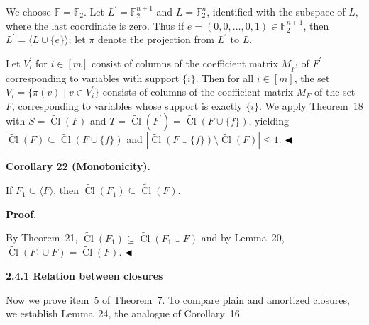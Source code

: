 We choose $\mathbb{F}=\mathbb{F}_{2}$. Let $L^{\prime}=\mathbb{F}_{2}^{n+1}$ and $L=\mathbb{F}_{2}^{n}$, identified with the subspace of
$L$, where the last coordinate is zero. Thus if $e=(0,0,\dots,0,1)\in\mathbb{F}_{2}^{n+1}$, then $L^{\prime}=\langle L\cup\{e\}\rangle$; let $\pi$ denote the projection from $L^{\prime}$ to $L$.\par



Let $V^{\prime}_{i}$ for $i\in[m]$ consist of columns of the coefficient matrix $M_{F^{\prime}}$ of $F^{\prime}$ corresponding to variables with support $\{i\}$. Then for all $i\in[m]$, the set $V_{i}=\{\pi(v)\mid v\in V_{i}^{\prime}\}$ consists of columns of the coefficient matrix $M_{F}$ of the set $F$, corresponding to variables whose support is exactly $\{i\}$. We apply Theorem 18 with $S=\widetilde{\mathop{\mathrm{Cl}}}(F)$ and $T=\widetilde{\mathop{\mathrm{Cl}}}(F^{\prime})=\widetilde{\mathop{\mathrm{Cl}}}(F\cup\{f\})$, yielding $\widetilde{\mathop{\mathrm{Cl}}}(F)\subseteq\widetilde{\mathop{\mathrm{Cl}}}(F\cup\{f\})$ and $|\widetilde{\mathop{\mathrm{Cl}}}(F\cup\{f\})\setminus\widetilde{\mathop{\mathrm{Cl}}}(F)|\leq 1$.
$\hfill\blacktriangleleft$\par



\par\medskip\noindent\textbf{
Corollary 22 (Monotonicity).
}\par



If $F_{1}\subseteq\langle F\rangle$, then $\widetilde{\mathop{\mathrm{Cl}}}(F_{1})\subseteq\widetilde{\mathop{\mathrm{Cl}}}(F)$.\par



\par\medskip\noindent\textbf{Proof.}\par


By Theorem 21, $\widetilde{\mathop{\mathrm{Cl}}}(F_{1})\subseteq\widetilde{\mathop{\mathrm{Cl}}}(F_{1}\cup F)$ and by Lemma 20, $\widetilde{\mathop{\mathrm{Cl}}}(F_{1}\cup F)=\widetilde{\mathop{\mathrm{Cl}}}(F)$.
$\hfill\blacktriangleleft$\par


\par\medskip\noindent\textbf{
2.4.1 Relation between closures}\par


Now we prove item 5 of Theorem 7. To compare plain and amortized closures, we establish Lemma 24, the analogue of Corollary 16.\par



